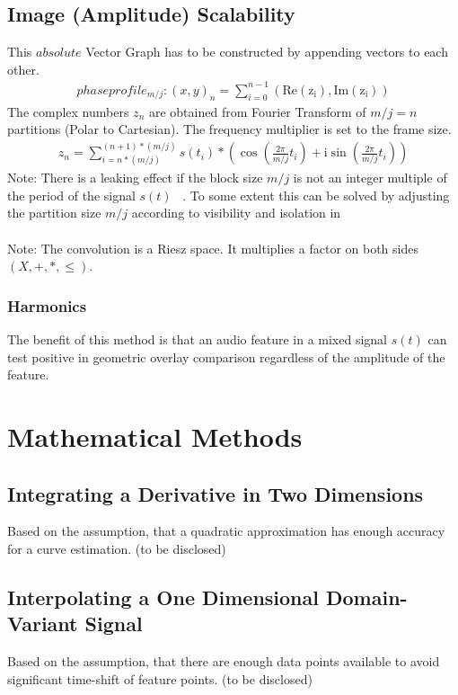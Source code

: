 \documentclass{report}
\begin{document}
\section{Image (Amplitude) Scalability}
This $absolute$ Vector Graph has to be constructed by appending vectors to each other.
\begin{align}
phaseprofile_{m/j}: (x,y)_{n}=\sum \limits _{i=0}^{n-1}(\mathrm{Re(z_{i})},\mathrm{Im(z_{i})})
\end{align}
The complex numbers $z_{n}$ are obtained from Fourier Transform of $m/j=n$ partitions (Polar to Cartesian). The frequency multiplier is set to the frame size.
\begin{align}
z_{n}= \sum \limits _{i=n*(m/j)}^{(n+1)*(m/j)} s(t_{i})*(\cos(\frac{2\pi}{m/j}t_{i})+\mathrm{i}\sin(\frac{2\pi}{m/j}t_{i}))\label{eq:3}
\end{align}
Note: There is a leaking effect if the block size $m/j$ is not an integer multiple of the period of the signal $s(t)$ ~\cite[Fensterfunktion]{Fensterfunktion}. To some extent this can be solved by adjusting the partition size $m/j$ according to visibility and isolation in ~\cite[Stopeight\_Comparator.tex]{Comparator}\\\\
Note: The convolution is a Riesz space. It multiplies a factor on both sides $(X,+,*,\leq)$.
\subsection{Harmonics}
The benefit of this method is that an audio feature in a mixed signal $s(t)$ can test positive in geometric overlay comparison regardless of the amplitude of the feature.

\chapter{Mathematical Methods}
\section{Integrating a Derivative in Two Dimensions}
Based on the assumption, that a quadratic approximation has enough accuracy for a curve estimation. (to be disclosed)
\section{Interpolating a One Dimensional Domain-Variant Signal}
Based on the assumption, that there are enough data points available to avoid significant time-shift of feature points. (to be disclosed)

\iffalse
\printbibliography
\fi
{}

\end{document}
